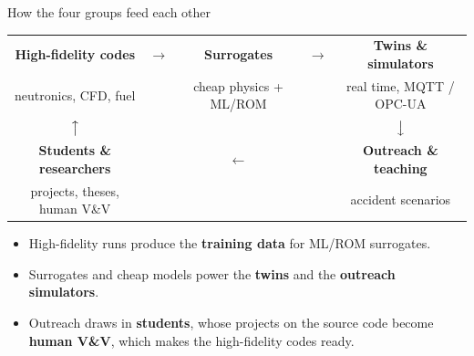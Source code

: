 \documentclass[aspectratio=169]{beamer}
\begin{document}
\begin{frame}{How the four groups feed each other}
    \begin{center}
        \footnotesize
        \setlength{\tabcolsep}{6pt}
        \begin{tabular}{ccccc}
            \textbf{High-fidelity codes} & $\longrightarrow$ &
            \textbf{Surrogates} & $\longrightarrow$ &
            \textbf{Twins \& simulators} \\
            {\scriptsize neutronics, CFD, fuel} & &
            {\scriptsize cheap physics + ML/ROM} & &
            {\scriptsize real time, MQTT / OPC-UA} \\[6pt]
            $\big\uparrow$ & & & & $\big\downarrow$ \\[2pt]
            \textbf{Students \& researchers} & & $\longleftarrow$ & &
            \textbf{Outreach \& teaching} \\
            {\scriptsize projects, theses, human V\&V} & & & &
            {\scriptsize accident scenarios}
        \end{tabular}
    \end{center}

    \medskip
    \begin{itemize}
        \item High-fidelity runs produce the \textbf{training data} for
              ML/ROM surrogates.
        \item Surrogates and cheap models power the \textbf{twins} and the
              \textbf{outreach simulators}.
        \item Outreach draws in \textbf{students}, whose projects on the
              source code become \textbf{human V\&V}, which makes the
              high-fidelity codes ready.
    \end{itemize}
\end{frame}
\end{document}
